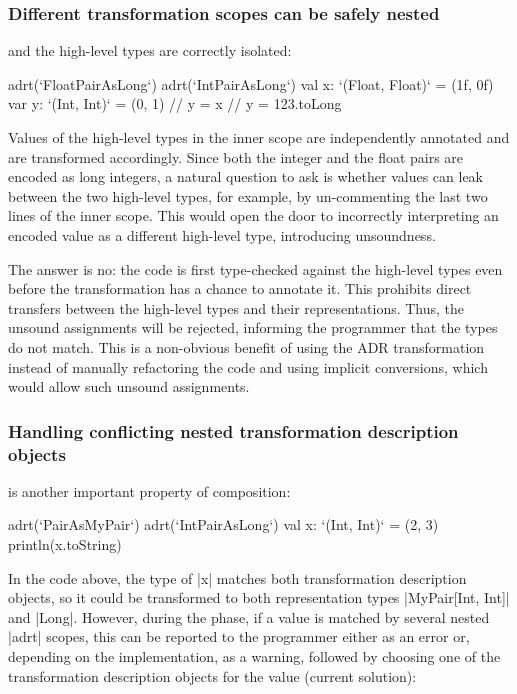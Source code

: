 \subsubsection{Different transformation scopes can be safely nested} and the high-level types are correctly isolated:

\begin{lstlisting-nobreak}
adrt(`FloatPairAsLong`) {
  adrt(`IntPairAsLong`) {
    val x: `(Float, Float)` = (1f, 0f)
    var y: `(Int, Int)` = (0, 1)
    // y = x
    // y = 123.toLong
  }
}
\end{lstlisting-nobreak}

Values of the high-level types in the inner scope are independently annotated and are transformed accordingly. Since both the integer and the float pairs are encoded as long integers, a natural question to ask is whether values can leak between the two high-level types, for example, by un-commenting the last two lines of the inner scope. This would open the door to incorrectly interpreting an encoded value as a different high-level type, introducing unsoundness.

The answer is no: the code is first type-checked against the high-level types even before the \inject{} transformation has a chance to annotate it. This prohibits direct transfers between the high-level types and their representations. Thus, the unsound assignments will be rejected, informing the programmer that the types do not match. This is a non-obvious benefit of using the ADR transformation instead of manually refactoring the code and using implicit conversions, which would allow such unsound assignments.

\subsubsection{Handling conflicting nested transformation description objects} is another important property of composition:

\begin{lstlisting-nobreak}
adrt(`PairAsMyPair`) {
  adrt(`IntPairAsLong`) {
    val x: `(Int, Int)` = (2, 3)
  }
  println(x.toString)
}
\end{lstlisting-nobreak}

In the code above, the type of |x| matches both transformation description objects, so it could be transformed to both representation types |MyPair[Int, Int]| and |Long|. However, during the \inject{} phase, if a value is matched by several nested |adrt| scopes, this can be reported to the programmer either as an error or, depending on the implementation, as a warning, followed by choosing one of the transformation description objects for the value (current solution):

